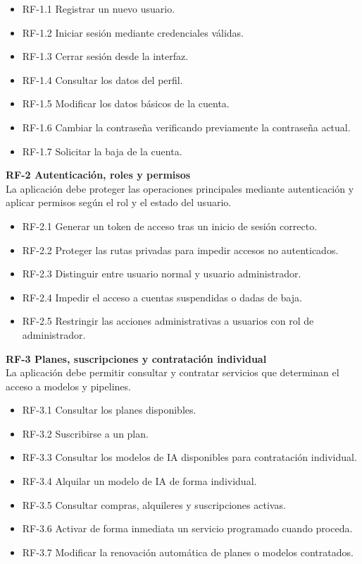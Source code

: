 \begin{itemize}
	\item RF-1.1 Registrar un nuevo usuario.
	\item RF-1.2 Iniciar sesión mediante credenciales válidas.
	\item RF-1.3 Cerrar sesión desde la interfaz.
	\item RF-1.4 Consultar los datos del perfil.
	\item RF-1.5 Modificar los datos básicos de la cuenta.
	\item RF-1.6 Cambiar la contraseña verificando previamente la contraseña actual.
	\item RF-1.7 Solicitar la baja de la cuenta.
\end{itemize}

\textbf{RF-2 Autenticación, roles y permisos}\\
La aplicación debe proteger las operaciones principales mediante autenticación y aplicar permisos según el rol y el estado del usuario.

\begin{itemize}
	\item RF-2.1 Generar un token de acceso tras un inicio de sesión correcto.
	\item RF-2.2 Proteger las rutas privadas para impedir accesos no autenticados.
	\item RF-2.3 Distinguir entre usuario normal y usuario administrador.
	\item RF-2.4 Impedir el acceso a cuentas suspendidas o dadas de baja.
	\item RF-2.5 Restringir las acciones administrativas a usuarios con rol de administrador.
\end{itemize}

\textbf{RF-3 Planes, suscripciones y contratación individual}\\
La aplicación debe permitir consultar y contratar servicios que determinan el acceso a modelos y pipelines.

\begin{itemize}
	\item RF-3.1 Consultar los planes disponibles.
	\item RF-3.2 Suscribirse a un plan.
	\item RF-3.3 Consultar los modelos de IA disponibles para contratación individual.
	\item RF-3.4 Alquilar un modelo de IA de forma individual.
	\item RF-3.5 Consultar compras, alquileres y suscripciones activas.
	\item RF-3.6 Activar de forma inmediata un servicio programado cuando proceda.
	\item RF-3.7 Modificar la renovación automática de planes o modelos contratados.
\end{itemize}

